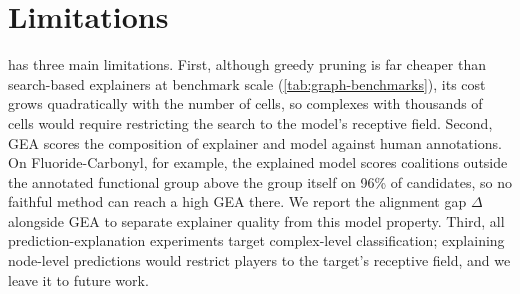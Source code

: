 \section{Limitations}
\label{sec:limitations}

\method has three main limitations. First, although greedy pruning is
far cheaper than search-based explainers at benchmark scale
(\cref{tab:graph-benchmarks}), its cost grows quadratically with the
number of cells, so complexes with thousands of cells would require
restricting the search to the model's receptive field. Second, GEA
scores the composition of explainer and model against human
annotations. On Fluoride-Carbonyl, for example, the explained model
scores coalitions outside the annotated functional group above the
group itself on 96\% of candidates, so no faithful method can reach a
high GEA there. We report the alignment gap $\Delta$ alongside GEA to
separate explainer quality from this model property. Third, all
prediction-explanation experiments target complex-level
classification; explaining node-level predictions would restrict
players to the target's receptive field, and we leave it to future
work.
